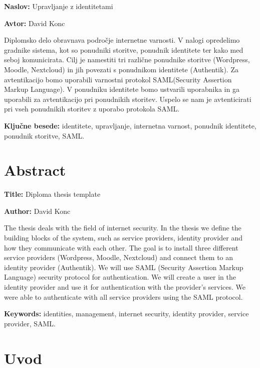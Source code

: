 \documentclass[a4paper,12pt,openright,oneside]{book}
\newcommand{\ttitle}{Upravljanje z identitetami}
\newcommand{\ttitleEn}{Diploma thesis template}
\newcommand{\tauthor}{David Konc}
\newcommand{\tkeywords}{identitete, upravljanje, internetna varnost, ponudnik identitete, ponudnik storitve, SAML}
\newcommand{\tkeywordsEn}{identities, management, internet security, identity provider, service provider, SAML}
\newcommand{\clearemptydoublepage}{\newpage{\pagestyle{empty}\cleardoublepage}}
\begin{document}
\noindent\textbf{Naslov:} \ttitle
\bigskip

\noindent\textbf{Avtor:} \tauthor
\bigskip

\noindent Diplomsko delo obravnava področje internetne varnosti. V nalogi opredelimo gradnike sistema, kot so ponudniki storitve, ponudnik identitete ter kako med seboj komunicirata. Cilj je namestiti tri različne ponudnike storitve (Wordpress, Moodle, Nextcloud) in jih povezati s ponudnikom identitete (Authentik). Za avtentikacijo bomo uporabili varnostni protokol SAML(Security Assertion Markup Language). V ponudniku identitete bomo ustvarili uporabnika in ga uporabili za avtentikacijo pri ponudnikih storitev. Uspelo se nam je avtenticirati pri vseh ponudnikih storitev z uporabo protokola SAML. 
\bigskip

\noindent\textbf{Ključne besede:} \tkeywords.
\clearemptydoublepage

\chapter*{Abstract}

\noindent\textbf{Title:} \ttitleEn
\bigskip

\noindent\textbf{Author:} \tauthor
\bigskip

\noindent The thesis deals with the field of internet security. In the thesis we define the building blocks of the system, such as service providers, identity provider and how they communicate with each other. The goal is to install three different service providers (Wordpress, Moodle, Nextcloud) and connect them to an identity provider (Authentik). We will use SAML (Security Assertion Markup Language) security protocol for authentication. We will create a user in the identity provider and use it for authentication with the provider's services. We were able to authenticate with all service providers using the SAML protocol.


\bigskip

\noindent\textbf{Keywords:} \tkeywordsEn.
\clearemptydoublepage

\mainmatter
\setcounter{page}{1}
\pagestyle{fancy}

\chapter{Uvod}
\end{document}
